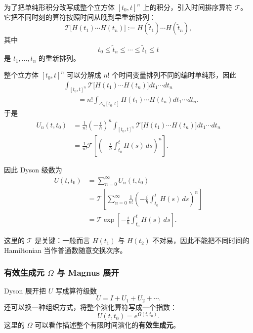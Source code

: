 \documentclass[UTF8,a4paper,11pt,openany]{ctexbook}
\begin{document}
为了把单纯形积分改写成整个立方体
$[t_0,t]^n$ 上的积分，引入时间排序算符 $\mathcal T$。它把不同时刻的算符按照时间从晚到早重新排列：
\begin{equation}
    \mathcal T
    \bigl[
        H(t_1)\cdots H(t_n)
    \bigr]
    :=
    H(\tilde t_1)\cdots H(\tilde t_n),
\end{equation}
其中
\[
t_0\leq\tilde t_n\leq\cdots\leq\tilde t_1\leq t
\]
是 $t_1,\ldots,t_n$ 的重新排列。

整个立方体 $[t_0,t]^n$ 可以分解成 $n!$ 个时间变量排列不同的编时单纯形，因此
\begin{align}
    &
    \int_{[t_0,t]^n}
    \mathcal T
    \bigl[
        H(t_1)\cdots H(t_n)
    \bigr]
    dt_1\cdots dt_n
    \nonumber\\
    &\qquad=
    n!
    \int_{\Delta_n[t_0,t]}
    H(t_1)\cdots H(t_n)
    dt_1\cdots dt_n.
\end{align}
于是
\begin{align}
    U_n(t,t_0)
    &=
    \frac{1}{n!}
    \left(-\frac{i}{\hbar}\right)^n
    \int_{[t_0,t]^n}
    \mathcal T
    \bigl[
        H(t_1)\cdots H(t_n)
    \bigr]
    dt_1\cdots dt_n
    \nonumber\\
    &=
    \frac{1}{n!}
    \mathcal T
    \left[
        \left(
        -\frac{i}{\hbar}
        \int_{t_0}^{t}H(s)\,ds
        \right)^n
    \right].
\end{align}

因此 Dyson 级数为
\begin{align}
    U(t,t_0)
    &=
    \sum_{n=0}^{\infty}U_n(t,t_0)
    \nonumber\\
    &=
    \mathcal T
    \left[
        \sum_{n=0}^{\infty}
        \frac{1}{n!}
        \left(
        -\frac{i}{\hbar}
        \int_{t_0}^{t}H(s)\,ds
        \right)^n
    \right]
    \nonumber\\
    &=
    \mathcal T
    \exp\left[
        -\frac{i}{\hbar}
        \int_{t_0}^{t}H(s)\,ds
    \right].
\end{align}

这里的 $\mathcal T$ 是关键：一般而言
$H(t_1)$ 与 $H(t_2)$ 不对易，因此不能把不同时间的 Hamiltonian 当作普通数随意交换次序。

\subsubsection*{有效生成元 $\Omega$ 与 Magnus 展开}

Dyson 展开把 $U$ 写成算符级数
\[
U=I+U_1+U_2+\cdots.
\]
还可以换一种组织方式，将整个演化算符写成一个指数：
\begin{equation}
    U(t,t_0)
    =
    e^{\Omega(t,t_0)}.
\end{equation}
这里的 $\Omega$ 可以看作描述整个有限时间演化的\textbf{有效生成元}。
\end{document}
